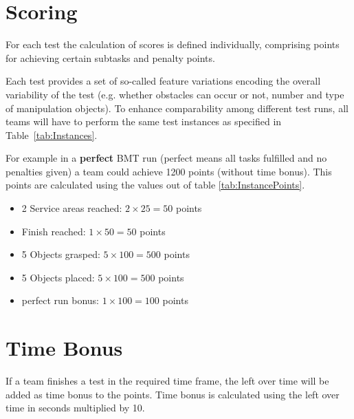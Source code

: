 \section{Scoring} \label{sec:ScoringAndRanking}

For each test the calculation of scores is defined individually, comprising points for achieving certain subtasks and penalty points.

Each test provides a set of so-called feature variations encoding the overall variability of the test (e.g. whether
obstacles can occur or not, number and type of manipulation objects). To enhance comparability among different test
runs, all teams will have to perform the same test instances as specified in Table~\ref{tab:Instances}.

For example in a \textbf{perfect} BMT run (perfect means all tasks fulfilled and no penalties given) a team could achieve 1200 points (without time bonus). This points are calculated using the values out of table \ref{tab:InstancePoints}.

\begin{itemize}
	\item 2 Service areas reached: $2 \times 25 = 50$ points
	\item Finish reached: $1 \times 50 = 50 $ points
	\item 5 Objects grasped: $5 \times 100 = 500 $ points
	\item 5 Objects placed: $5 \times 100 = 500  $ points
	\item perfect run bonus: $1 \times 100 = 100 $ points
\end{itemize}


\section{Time Bonus}
If a team finishes a test in the required time frame, the left over time will be added as time bonus to the points. 
Time bonus is calculated using the left over time in seconds multiplied by 10. 

